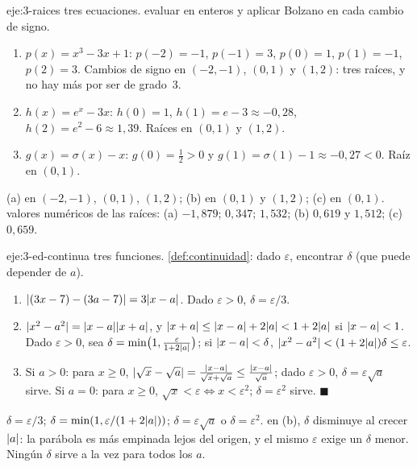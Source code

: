 \begin{solucion}{eje:3-raices}
\datos tres ecuaciones.
\planteamiento evaluar en enteros y aplicar Bolzano en cada cambio de signo.
\pasos
\begin{enumerate}[label=(\alph*)]
  \item $p(x)=x^{3}-3x+1$: $p(-2)=-1$, $p(-1)=3$, $p(0)=1$, $p(1)=-1$, $p(2)=3$. Cambios de signo en $(-2,-1)$, $(0,1)$ y $(1,2)$: tres raíces, y no hay más por ser de grado~3.
  \item $h(x)=e^{x}-3x$: $h(0)=1$, $h(1)=e-3\approx-0{,}28$, $h(2)=e^{2}-6\approx1{,}39$. Raíces en $(0,1)$ y $(1,2)$.
  \item $g(x)=\sigma(x)-x$: $g(0)=\frac12>0$ y $g(1)=\sigma(1)-1\approx-0{,}27<0$. Raíz en $(0,1)$.
\end{enumerate}
\resultado (a) en $(-2,-1)$, $(0,1)$, $(1,2)$; (b) en $(0,1)$ y $(1,2)$; (c) en $(0,1)$.
\comprobacion valores numéricos de las raíces: (a) $-1{,}879$; $0{,}347$; $1{,}532$; (b) $0{,}619$ y $1{,}512$; (c) $0{,}659$.
\end{solucion}

\begin{solucion}{eje:3-ed-continua}
\datos tres funciones.
\planteamiento \cref{def:continuidad}: dado $\varepsilon$, encontrar $\delta$ (que puede depender de $a$).
\pasos
\begin{enumerate}[label=(\alph*)]
  \item $\lvert(3x-7)-(3a-7)\rvert=3\lvert x-a\rvert$. Dado $\varepsilon>0$, $\delta=\varepsilon/3$.
  \item $\lvert x^{2}-a^{2}\rvert=\lvert x-a\rvert\lvert x+a\rvert$, y $\lvert x+a\rvert\le\lvert x-a\rvert+2\lvert a\rvert<1+2\lvert a\rvert$ si $\lvert x-a\rvert<1$. Dado $\varepsilon>0$, sea $\delta=\min\bigl(1,\frac{\varepsilon}{1+2\lvert a\rvert}\bigr)$; si $\lvert x-a\rvert<\delta$, $\lvert x^{2}-a^{2}\rvert<(1+2\lvert a\rvert)\delta\le\varepsilon$.
  \item Si $a>0$: para $x\ge0$, $\lvert\sqrt x-\sqrt a\rvert=\frac{\lvert x-a\rvert}{\sqrt x+\sqrt a}\le\frac{\lvert x-a\rvert}{\sqrt a}$; dado $\varepsilon>0$, $\delta=\varepsilon\sqrt a$ sirve. Si $a=0$: para $x\ge0$, $\sqrt x<\varepsilon\iff x<\varepsilon^{2}$; $\delta=\varepsilon^{2}$ sirve. \hfill$\blacksquare$
\end{enumerate}
\resultado $\delta=\varepsilon/3$; $\delta=\min(1,\varepsilon/(1+2\lvert a\rvert))$; $\delta=\varepsilon\sqrt a$ o $\delta=\varepsilon^{2}$.
\comprobacion en (b), $\delta$ disminuye al crecer $\lvert a\rvert$: la parábola es más empinada lejos del origen, y el mismo $\varepsilon$ exige un $\delta$ menor. Ningún $\delta$ sirve a la vez para todos los $a$.
\end{solucion}


